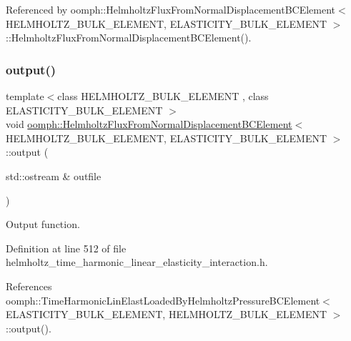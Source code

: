Referenced by oomph\+::\+Helmholtz\+Flux\+From\+Normal\+Displacement\+B\+C\+Element$<$ H\+E\+L\+M\+H\+O\+L\+T\+Z\+\_\+\+B\+U\+L\+K\+\_\+\+E\+L\+E\+M\+E\+N\+T, E\+L\+A\+S\+T\+I\+C\+I\+T\+Y\+\_\+\+B\+U\+L\+K\+\_\+\+E\+L\+E\+M\+E\+N\+T $>$\+::\+Helmholtz\+Flux\+From\+Normal\+Displacement\+B\+C\+Element().

\mbox{\label{classoomph_1_1HelmholtzFluxFromNormalDisplacementBCElement_a778e21256d01c8b51e4d9ab8e5767d5f}} 
\subsubsection{\texorpdfstring{output()}{output()}\hspace{0.1cm}{\footnotesize\ttfamily [1/4]}}
{\footnotesize\ttfamily template$<$class H\+E\+L\+M\+H\+O\+L\+T\+Z\+\_\+\+B\+U\+L\+K\+\_\+\+E\+L\+E\+M\+E\+NT , class E\+L\+A\+S\+T\+I\+C\+I\+T\+Y\+\_\+\+B\+U\+L\+K\+\_\+\+E\+L\+E\+M\+E\+NT $>$ \\
void \hyperlink{classoomph_1_1HelmholtzFluxFromNormalDisplacementBCElement}{oomph\+::\+Helmholtz\+Flux\+From\+Normal\+Displacement\+B\+C\+Element}$<$ H\+E\+L\+M\+H\+O\+L\+T\+Z\+\_\+\+B\+U\+L\+K\+\_\+\+E\+L\+E\+M\+E\+NT, E\+L\+A\+S\+T\+I\+C\+I\+T\+Y\+\_\+\+B\+U\+L\+K\+\_\+\+E\+L\+E\+M\+E\+NT $>$\+::output (\begin{DoxyParamCaption}\item[{std\+::ostream \&}]{outfile }\end{DoxyParamCaption})\hspace{0.3cm}{\ttfamily [inline]}}



Output function. 



Definition at line 512 of file helmholtz\+\_\+time\+\_\+harmonic\+\_\+linear\+\_\+elasticity\+\_\+interaction.\+h.



References oomph\+::\+Time\+Harmonic\+Lin\+Elast\+Loaded\+By\+Helmholtz\+Pressure\+B\+C\+Element$<$ E\+L\+A\+S\+T\+I\+C\+I\+T\+Y\+\_\+\+B\+U\+L\+K\+\_\+\+E\+L\+E\+M\+E\+N\+T, H\+E\+L\+M\+H\+O\+L\+T\+Z\+\_\+\+B\+U\+L\+K\+\_\+\+E\+L\+E\+M\+E\+N\+T $>$\+::output().

